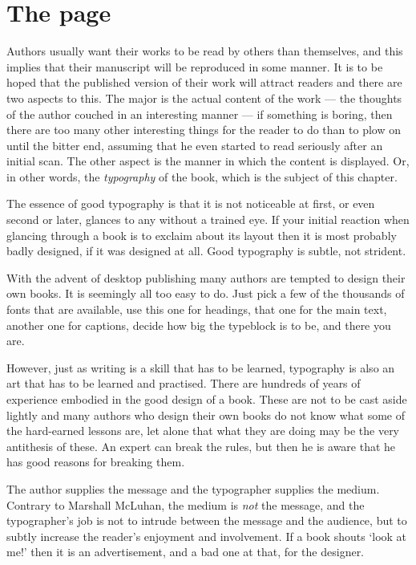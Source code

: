 \documentclass[10pt,a4paper,oneside,extrafontsizes]{memoir}%
\begin{document}
\chapter{The page}  \label{chap:lpage}

\begin{paracol}{2}
\switchEng
    Authors usually want their works to be read by others than themselves,
and this implies that their manuscript will be reproduced in some manner.
It is to be hoped that the published version of their work will attract 
readers and there are two aspects to this. The major is the actual content
of the work --- the thoughts of the author couched in an interesting
manner --- if something is boring, then there are too many other interesting
things for the reader to do than to plow on until the bitter end, 
assuming that he
even started to read seriously after an initial scan. The other aspect is
the manner in which the content is displayed. Or, in other words, 
the \emph{typography}
of the book, which is the subject of this chapter.

    The essence of good typography is that it is not noticeable at first,
or even second or later, glances to any without a trained eye. If your
initial reaction when glancing through a book is to exclaim about its layout
then it is most probably badly designed, if it was designed at all. Good
typography is subtle, not strident. 

    With the advent of desktop publishing
many authors are tempted to design their own books. It is seemingly all
too easy to do. Just pick a few of the thousands of fonts that are available,
use this one for headings, 
that one for the main text, another one for
captions, decide how big the typeblock is to be, and there you are.

    However, just as writing is a skill that has to be learned, typography
is also an art that has to be learned and practised. There are hundreds
of years of experience embodied in the good design of a book. These are
not to be cast aside lightly and many authors who design their own books
do not know what some of the hard-earned lessons are, let alone that what
they are doing may be the very antithesis of these. An expert can break
the rules, but then he is aware that he has good reasons for breaking them.

    The author supplies the message and the typographer supplies the medium.
Contrary to Marshall McLuhan, the medium is \emph{not} the message, 
and the typographer's job is not to
intrude between the message and the audience, but to subtly increase the
reader's enjoyment and involvement. If a book shouts `look at me!' then it
is an advertisement, and a bad one at that, for the designer.
\end{paracol}
\end{document}

